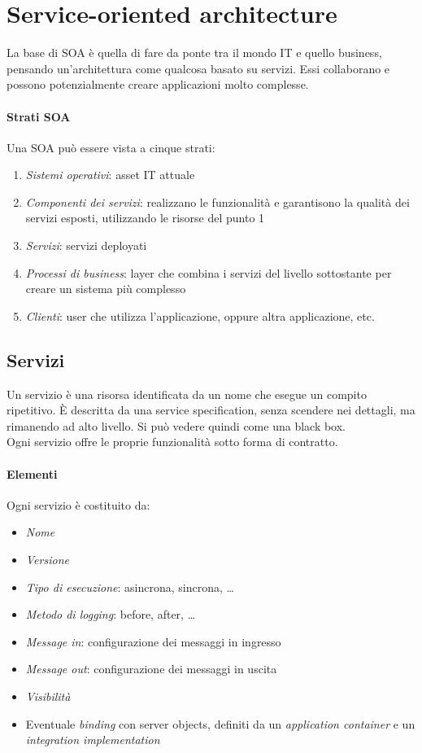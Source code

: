\section{Service-oriented architecture}
La base di SOA è quella di fare da ponte tra il mondo IT e quello business, 
pensando un'architettura come qualcosa basato su servizi.
Essi collaborano e possono potenzialmente creare applicazioni molto complesse.

\paragraph{Strati SOA}
Una SOA può essere vista a cinque strati:
\begin{enumerate}
    \item \emph{Sistemi operativi}: asset IT attuale
    \item \emph{Componenti dei servizi}: realizzano le funzionalità e garantisono la qualità
    dei servizi esposti, utilizzando le risorse del punto 1
    \item \emph{Servizi}: servizi deployati
    \item \emph{Processi di business}: layer che combina i servizi del livello sottostante
    per creare un sistema più complesso
    \item \emph{Clienti}: user che utilizza l'applicazione, oppure altra applicazione, etc. 
\end{enumerate}

\subsection{Servizi}
Un servizio è una risorsa identificata da un nome che esegue un compito ripetitivo.
È descritta da una service specification, senza scendere nei dettagli, ma rimanendo 
ad alto livello. Si può vedere quindi come una black box.\\
Ogni servizio offre le proprie funzionalità sotto forma di contratto.
\paragraph{Elementi}
Ogni servizio è costituito da:
\begin{itemize}
    \item \emph{Nome}
    \item \emph{Versione}
    \item \emph{Tipo di esecuzione}: asincrona, sincrona, \dots
    \item \emph{Metodo di logging}: before, after, \dots
    \item \emph{Message in}: configurazione dei messaggi in ingresso
    \item \emph{Message out}: configurazione dei messaggi in uscita
    \item \emph{Visibilità}
    \item Eventuale \emph{binding} con server objects, definiti da un \emph{application 
    container} e un \emph{integration implementation}
\end{itemize}

